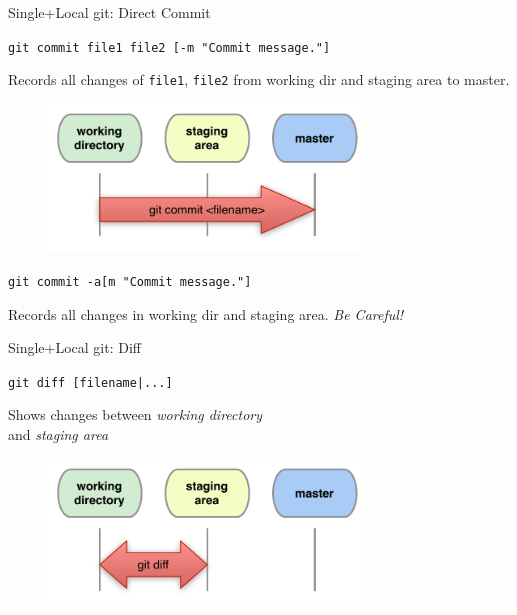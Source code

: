 \documentclass{beamer}
\newcommand{\git}{git\xspace}
\begin{document}

\begin{frame}{Single+Local \git: Direct Commit}
  \begin{center}
    \texttt{git commit file1 file2 [-m "Commit message."]}
  \end{center}
  Records all changes of \texttt{file1},
  \texttt{file2} from working dir and staging area to master.
  \begin{figure}
    \centering
    \includegraphics[width=0.75\textwidth]{figs/local-commit-filename}
  \end{figure}
  \begin{center}
    \texttt{git commit -a[m "Commit message."]}
  \end{center}
  Records all changes in working dir and staging area. \emph{Be Careful!}
\end{frame}


\begin{frame}{Single+Local \git: Diff}
  \begin{center}
    \texttt{git diff [filename|...]}
  \end{center}
  Shows changes between \emph{working directory}\\
  and \emph{staging area}
  \begin{figure}
    \centering
    \includegraphics[width=0.75\textwidth]{figs/local-diff}
  \end{figure}
\end{frame}
\end{document}

